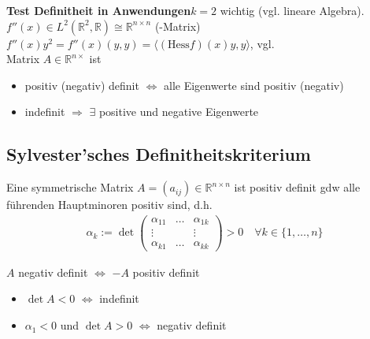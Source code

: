 \textbf{Test Definitheit in Anwendungen}$k=2$ wichtig (vgl. lineare Algebra). \\
	
	$f''(x) \in L^2(\mathbb{R}^2,\mathbb{R})\cong \mathbb{R}^{n\times n}$ (-Matrix)\\
	
	$f''(x) y^2 = f''(x) (y,y) = \langle (\mathrm{Hess} f)(x)y, y\rangle$, vgl. \\
	
	Matrix $A\in\mathbb{R}^{n\times}$ ist \begin{itemize}
		\item positiv (negativ) definit $\Leftrightarrow$ alle Eigenwerte sind positiv (negativ) 
		\item indefinit $\Rightarrow$ $\exists$ positive und negative Eigenwerte
	\end{itemize}

\subsection{Sylvester'sches Definitheitskriterium}
Eine symmetrische Matrix $A=(a_{ij})\in\mathbb{R}^{n\times n}$ ist positiv definit \gls{gdw} alle führenden Hauptminoren positiv sind, d.h. \begin{align*}
	\alpha_k := \det\begin{pmatrix}
		\alpha_{11} & \dots & \alpha_{1k} \\ \vdots && \vdots \\ \alpha_{k1} & \dots & \alpha_{kk}
	\end{pmatrix} > 0\quad\forall k\in\{1,\dotsc,n\}
\end{align*}

\begin{underlinedenvironment}[beachte]
	$A$ negativ definit $\Leftrightarrow$ $-A$ positiv definit
\end{underlinedenvironment}
\begin{underlinedenvironment}[Spezialfall $n=2$]\vspace*{0pt}
	\begin{itemize}[topsep=\dimexpr-\baselineskip/2\relax]
		\item $\det A <0 $ $\Leftrightarrow$ indefinit
		\item $\alpha_1 < 0$ und $\det A > 0$ $\Leftrightarrow$ negativ definit
	\end{itemize}
\end{underlinedenvironment}

